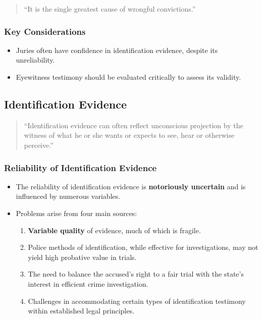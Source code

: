 \begin{quote}
``It is the single greatest cause of wrongful convictions.''
\end{quote}

\subsubsection{Key Considerations}\label{key-considerations}

\begin{itemize}
\tightlist
\item
  Juries often have confidence in identification evidence, despite its
  unreliability.
\item
  Eyewitness testimony should be evaluated critically to assess its
  validity.
\end{itemize}

\subsection{  Identification Evidence}\label{identification-evidence-1}

\begin{quote}
``Identification evidence can often reflect unconscious projection by
the witness of what he or she wants or expects to see, hear or otherwise
perceive.''
\end{quote}

\subsubsection{Reliability of Identification
Evidence}\label{reliability-of-identification-evidence}

\begin{itemize}
\tightlist
\item
  The reliability of identification evidence is \textbf{notoriously
  uncertain} and is influenced by numerous variables.
\item
  Problems arise from four main sources:

  \begin{enumerate}
  \def\labelenumi{\arabic{enumi}.}
  \tightlist
  \item
    \textbf{Variable quality} of evidence, much of which is fragile.
  \item
    Police methods of identification, while effective for
    investigations, may not yield high probative value in trials.
  \item
    The need to balance the accused's right to a fair trial with the
    state's interest in efficient crime investigation.
  \item
    Challenges in accommodating certain types of identification
    testimony within established legal principles.
  \end{enumerate}
\end{itemize}

